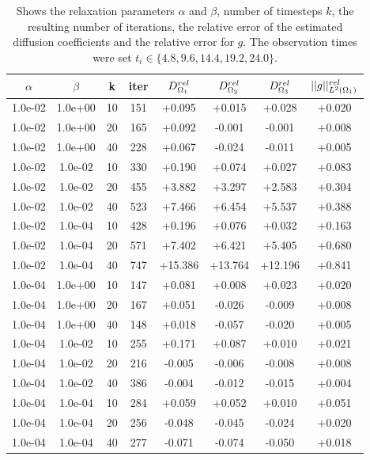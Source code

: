 \documentclass[11pt,a4paper]{article}
\begin{document}
\begin{table}
\centering
\caption{ Shows the relaxation parameters $\alpha$ and $\beta$, number of timesteps $k$, the resulting number of iterations, the relative error of the estimated diffusion coefficients and the relative error for $g$. The observation times were set $t_i \in \lbrace 4.8, 9.6, 14.4, 19.2, 24.0 \rbrace $. }
\begin{tabular}{*{8}c}
$\alpha$ & $\beta$ & k & iter & $ D_{\Omega_1}\sp{rel}$& $D_{\Omega_2}\sp{rel} $ & $D_{\Omega_3}\sp{rel} $&$|| g ||\sp{rel}_{L\sp{2}(\Omega_1)} $ \\
\hline
 1.0e-02 	 & 1.0e+00 	 & 10 & 151 	 & +0.095 & +0.015 & +0.028 & +0.020 \\ 
 1.0e-02 	 & 1.0e+00 	 & 20 & 165 	 & +0.092 & -0.001 & -0.001 & +0.008 \\ 
 1.0e-02 	 & 1.0e+00 	 & 40 & 228 	 & +0.067 & -0.024 & -0.011 & +0.005 \\ 
 
 1.0e-02 	 & 1.0e-02 	 & 10 & 330 	 & +0.190 & +0.074 & +0.027 & +0.083 \\ 
 1.0e-02 	 & 1.0e-02 	 & 20 & 455 	 & +3.882 & +3.297 & +2.583 & +0.304 \\ 
  1.0e-02 	 & 1.0e-02 	 & 40 & 523 	 & +7.466 & +6.454 & +5.537 & +0.388 \\ 

 1.0e-02 	 & 1.0e-04 	 & 10 & 428 	 & +0.196 & +0.076 & +0.032 & +0.163 \\ 
 1.0e-02 	 & 1.0e-04 	 & 20 & 571 	 & +7.402 & +6.421 & +5.405 & +0.680 \\ 
 1.0e-02 	 & 1.0e-04 	 & 40 & 747 	 & +15.386 & +13.764 & +12.196 & +0.841 \\ 
  
  1.0e-04 	 & 1.0e+00 	 & 10 & 147 	 & +0.081 & +0.008 & +0.023 & +0.020 \\ 
  1.0e-04 	 & 1.0e+00 	 & 20 & 167 	 & +0.051 & -0.026 & -0.009 & +0.008 \\ 
  1.0e-04 	 & 1.0e+00 	 & 40 & 148 	 & +0.018 & -0.057 & -0.020 & +0.005 \\ 
  
 1.0e-04 	 & 1.0e-02 	 & 10 & 255 	 & +0.171 & +0.087 & +0.010 & +0.021 \\ 
 1.0e-04 	 & 1.0e-02 	 & 20 & 216 	 & -0.005 & -0.006 & -0.008 & +0.008 \\ 
 1.0e-04 	 & 1.0e-02 	 & 40 & 386 	 & -0.004 & -0.012 & -0.015 & +0.004 \\ 
  
  
 1.0e-04 	 & 1.0e-04 	 & 10 & 284 	 & +0.059 & +0.052 & +0.010 & +0.051 \\ 
 1.0e-04 	 & 1.0e-04 	 & 20 & 256 	 & -0.048 & -0.045 & -0.024 & +0.020 \\ 
  1.0e-04 	 & 1.0e-04 	 & 40 & 277 	 & -0.071 & -0.074 & -0.050 & +0.018 \\ 
  

\end{tabular}
\end{table}
\end{document}

